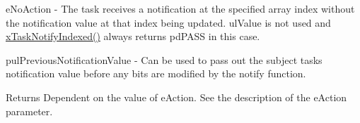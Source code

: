 e\+No\+Action -\/ The task receives a notification at the specified array index without the notification value at that index being updated. ul\+Value is not used and \hyperlink{externals_2freertos_2include_2task_8h_a0261e3cca34893bdfccbca1be2de93d5}{x\+Task\+Notify\+Indexed()} always returns pd\+P\+A\+SS in this case.

pul\+Previous\+Notification\+Value -\/ Can be used to pass out the subject task\textquotesingle{}s notification value before any bits are modified by the notify function.

\begin{DoxyReturn}{Returns}
Dependent on the value of e\+Action. See the description of the e\+Action parameter. 
\end{DoxyReturn}
